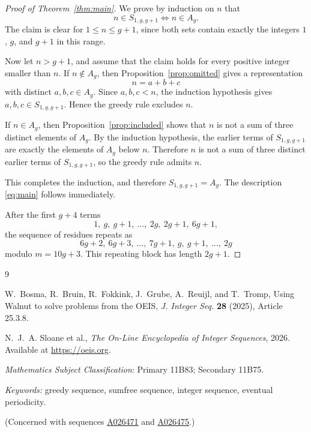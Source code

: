 \documentclass[12pt]{article}
\newcommand{\seqnum}[1]{\href{https://oeis.org/#1}{\rm \underline{#1}}}
\begin{document}
\begin{proof}[Proof of Theorem~\ref{thm:main}]
We prove by induction on $n$ that
\[
n\in S_{1,g,g+1}
\iff
n\in A_g.
\]
The claim is clear for $1\le n\le g+1$, since both sets contain exactly the integers $1$, $g$, and $g+1$ in this range.

Now let $n>g+1$, and assume that the claim holds for every positive integer smaller than $n$. If $n\notin A_g$, then Proposition~\ref{prop:omitted} gives a representation
\[
n=a+b+c
\]
with distinct $a,b,c\in A_g$. Since $a,b,c<n$, the induction hypothesis gives $a,b,c\in S_{1,g,g+1}$. Hence the greedy rule excludes $n$.

If $n\in A_g$, then Proposition~\ref{prop:included} shows that $n$ is not a sum of three distinct elements of $A_g$. By the induction hypothesis, the earlier terms of $S_{1,g,g+1}$ are exactly the elements of $A_g$ below $n$. Therefore $n$ is not a sum of three distinct earlier terms of $S_{1,g,g+1}$, so the greedy rule admits $n$.

This completes the induction, and therefore $S_{1,g,g+1}=A_g$. The description \eqref{eq:main} follows immediately.

After the first $g+4$ terms
\[
1,\ g,\ g+1,\ \ldots,\ 2g,\ 2g+1,\ 6g+1,
\]
the sequence of residues repeats as
\[
6g+2,\ 6g+3,\ \ldots,\ 7g+1,\ g,\ g+1,\ \ldots,\ 2g
\]
modulo $m=10g+3$. This repeating block has length $2g+1$.
\end{proof}

\begin{thebibliography}{9}

W.~Bosma, R.~Bruin, R.~Fokkink, J.~Grube, A.~Reuijl, and T.~Tromp,
Using Walnut to solve problems from the OEIS,
\emph{J. Integer Seq.} \textbf{28} (2025), Article 25.3.8.

N.~J.~A. Sloane et al., \emph{The On-Line Encyclopedia of Integer Sequences}, 2026. Available at \url{https://oeis.org}.

\end{thebibliography}

\bigskip

 \emph{Mathematics Subject Classification}: Primary 11B83; Secondary 11B75.

\smallskip

\noindent
\emph{Keywords:} greedy sequence, sumfree sequence, integer sequence, eventual periodicity.

\bigskip

\noindent
(Concerned with sequences \seqnum{A026471} and \seqnum{A026475}.)
\end{document}
